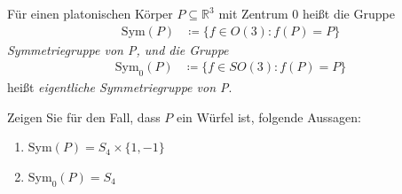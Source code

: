 \begin{solution}
\begin{enumerate}[label=(\alph*)]
\begin{figure}[H]
  \end{figure}
\end{enumerate}  
\end{solution}

\begin{assignment} 
  Für einen platonischen Körper \( P \subseteq \mathbb{R}^3 \) mit Zentrum \( 0 \) heißt die Gruppe
  \begin{align*}
    \text{Sym}(P) &\coloneqq \{ f \in O(3): f(P) = P \} 
  \end{align*} 
  \emph{Symmetriegruppe von P, und die Gruppe}
  \begin{align*}
    \text{Sym}_0(P) &\coloneqq \{ f \in SO(3): f(P) = P \}
  \end{align*}
  heißt \emph{eigentliche Symmetriegruppe von P}.

  Zeigen Sie für den Fall, dass \( P \) ein Würfel ist, folgende Aussagen: \\
  \begin{enumerate}[label=(\alph*)] 
    \item \( \text{Sym}(P) = S_4 \times \{ 1, -1 \} \)
    \item \( \text{Sym}_0(P) = S_4 \)
  \end{enumerate}
\end{assignment}
